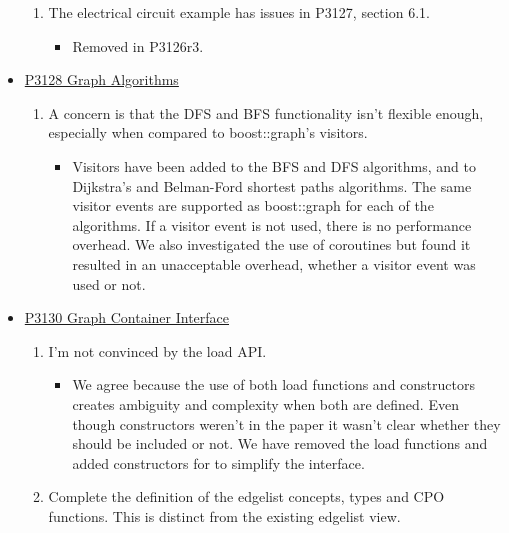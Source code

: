 \begin{itemize}
\begin{enumerate}
                  \item The electrical circuit example has issues in P3127, section 6.1.
                        \begin{itemize}
                              \item Removed in P3126r3.
                        \end{itemize}
            \end{enumerate}
      \item \href{https://www.wg21.link/P3128}{P3128 Graph Algorithms}
            \begin{enumerate}
                  \item A concern is that the DFS and BFS functionality isn't flexible enough, especially when compared to boost::graph's visitors.
                        \begin{itemize}
                              \item Visitors have been added to the BFS and DFS algorithms, and to Dijkstra's and Belman-Ford shortest 
                                    paths algorithms. The same visitor events are supported as boost::graph for each of the algorithms. 
                                    If a visitor event is not used, there is no performance overhead. We also investigated the use of 
                                    coroutines but found it resulted in an unacceptable overhead, whether a visitor event was used or not.
                        \end{itemize}
            \end{enumerate}
      \item \href{https://www.wg21.link/P3130}{P3130 Graph Container Interface}
            \begin{enumerate}
                  \item I'm not convinced by the load API.
                        \begin{itemize}
                              \item We agree because the use of both load functions and constructors creates ambiguity and complexity when both are defined.
                                    Even though constructors weren't in the paper it wasn't clear whether they should be included or not.
                                    We have removed the load functions and added constructors for  to simplify the interface.
                        \end{itemize}
                        \item Complete the definition of the edgelist concepts, types and CPO functions. This is distinct from the existing edgelist view.
                  \end{enumerate}
\end{itemize}
